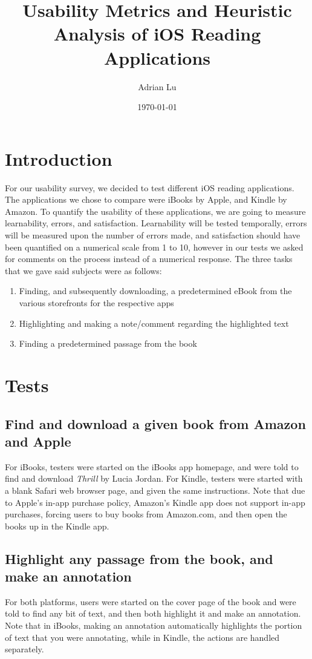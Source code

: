 \documentclass[11pt, oneside]{article}
\title{Usability Metrics and Heuristic Analysis of iOS Reading Applications}
\author{Adrian Lu}
\date{\today}
\begin{document}
\maketitle

\section{Introduction}
For our usability survey, we decided to test different iOS reading applications. The applications we chose to compare were iBooks by Apple, and Kindle by Amazon. To quantify the usability of these applications, we are going to measure learnability, errors, and satisfaction. Learnability will be tested temporally, errors will be measured upon the number of errors made, and satisfaction should have been quantified on a numerical scale from 1 to 10, however in our tests we asked for comments on the process instead of a numerical response. The three tasks that we gave said subjects were as follows:

\begin{enumerate}
    \item Finding, and subsequently downloading, a predetermined eBook from the various storefronts for the respective apps
    \item Highlighting and making a note/comment regarding the highlighted text
    \item Finding a predetermined passage from the book
\end{enumerate}

\section{Tests}

\subsection{Find and download a given book from Amazon and Apple}
For iBooks, testers were started on the iBooks app homepage, and were told to find and download \textit{Thrill} by Lucia Jordan. For Kindle, testers were started with a blank Safari web browser page, and given the same instructions. Note that due to Apple's in-app purchase policy, Amazon's Kindle app does not support in-app purchases, forcing users to buy books from Amazon.com, and then open the books up in the Kindle app.

\subsection{Highlight any passage from the book, and make an annotation}
For both platforms, users were started on the cover page of the book and were told to find any bit of text, and then both highlight it and make an annotation. Note that in iBooks, making an annotation automatically highlights the portion of text that you were annotating, while in Kindle, the actions are handled separately.
\end{document}
